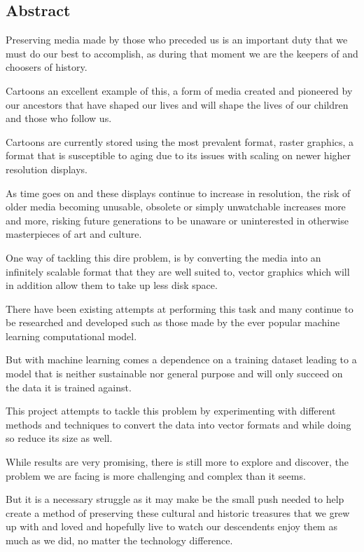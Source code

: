 \documentclass[12pt]{article}
\newcommand{\sentence}{} %
\begin{document}
    \begin{center}
        \section*{Abstract}
    \end{center}
    Preserving media made by those who preceded us is an important duty that we must do our best to
    accomplish, as during that moment we are the keepers of and choosers of history.
    \sentence
    Cartoons an excellent example of this, a form of media created and pioneered by our ancestors that have shaped
    our lives and will shape the lives of our children and those who follow us.
    \sentence
    Cartoons are currently stored using the most prevalent format, raster graphics, a format that is susceptible to
    aging due to its issues with scaling on newer higher resolution displays.
    \sentence
    As time goes on and these displays continue to increase in resolution, the risk of older media becoming unusable,
    obsolete or simply unwatchable increases more and more, risking future generations to be unaware or uninterested
    in otherwise masterpieces of art and culture.
    \sentence
    One way of tackling this dire problem, is by converting the media into an infinitely scalable format that they
    are well suited to, vector graphics which will in addition allow them to take up less disk space.
    \sentence
    There have been existing attempts at performing this task and many continue to be researched and developed such
    as those made by the ever popular machine learning computational model.
    \sentence
    But with machine learning comes a dependence on a training dataset leading to a model that is neither sustainable
    nor general purpose and will only succeed on the data it is trained against.
    \sentence
    This project attempts to tackle this problem by experimenting with different methods and techniques to convert
    the data into vector formats and while doing so reduce its size as well.
    \sentence
    While results are very promising, there is still more to explore and discover, the problem we are facing is more
    challenging and complex than it seems.
    \sentence
    But it is a necessary struggle as it may make be the small push needed to help create a method of preserving
    these cultural and historic treasures that we grew up with and loved and hopefully live to watch our descendents
    enjoy them as much as we did, no matter the technology difference.

    \pagebreak
\end{document}
